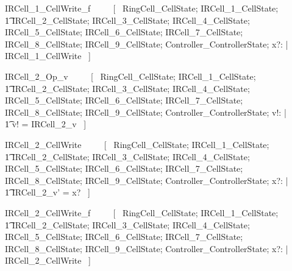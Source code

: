 \documentclass{article}
\begin{document}
\begin{zed}
IRCell\_1\_CellWrite\_f ~~~~ [~ 
    \Xi RingCell\_CellState; 
    \Xi IRCell\_1\_CellState; \\
    \t1 \Xi IRCell\_2\_CellState; 
    \Xi IRCell\_3\_CellState;
    \Xi IRCell\_4\_CellState; 
    \Xi IRCell\_5\_CellState; 
    \Xi IRCell\_6\_CellState; 
    \Xi IRCell\_7\_CellState; 
    \Xi IRCell\_8\_CellState; 
    \Xi IRCell\_9\_CellState; 
    \Xi Controller\_ControllerState; 
    x?: \nat | \\
    \lnot \pre IRCell\_1\_CellWrite ~] \\
\end{zed}

\begin{zed}
IRCell\_2\_Op\_v ~~~~ [~ 
    \Xi RingCell\_CellState; 
    \Xi IRCell\_1\_CellState; \\
    \t1 \Xi IRCell\_2\_CellState; 
    \Xi IRCell\_3\_CellState;
    \Xi IRCell\_4\_CellState; 
    \Xi IRCell\_5\_CellState; 
    \Xi IRCell\_6\_CellState; 
    \Xi IRCell\_7\_CellState; 
    \Xi IRCell\_8\_CellState; 
    \Xi IRCell\_9\_CellState; 
    \Xi Controller\_ControllerState; v!: \nat | \\
    \t1 v! = IRCell\_2\_v ~] \\
\end{zed}

\begin{zed}
IRCell\_2\_CellWrite ~~~~ [~ 
    \Xi RingCell\_CellState; 
    \Xi IRCell\_1\_CellState; \\
    \t1 \Delta IRCell\_2\_CellState; 
    \Xi IRCell\_3\_CellState;
    \Xi IRCell\_4\_CellState; 
    \Xi IRCell\_5\_CellState; 
    \Xi IRCell\_6\_CellState; 
    \Xi IRCell\_7\_CellState; 
    \Xi IRCell\_8\_CellState; 
    \Xi IRCell\_9\_CellState; 
    \Xi Controller\_ControllerState; 
    x?: \nat | \\
    \t1 IRCell\_2\_v' = x? ~] \\
\end{zed}

\begin{zed}
IRCell\_2\_CellWrite\_f ~~~~ [~ 
    \Xi RingCell\_CellState; 
    \Xi IRCell\_1\_CellState; \\
    \t1 \Xi IRCell\_2\_CellState; 
    \Xi IRCell\_3\_CellState;
    \Xi IRCell\_4\_CellState; 
    \Xi IRCell\_5\_CellState; 
    \Xi IRCell\_6\_CellState; 
    \Xi IRCell\_7\_CellState; 
    \Xi IRCell\_8\_CellState; 
    \Xi IRCell\_9\_CellState; 
    \Xi Controller\_ControllerState; 
    x?: \nat | \\
    \lnot \pre IRCell\_2\_CellWrite ~] \\
\end{zed}
\end{document}
